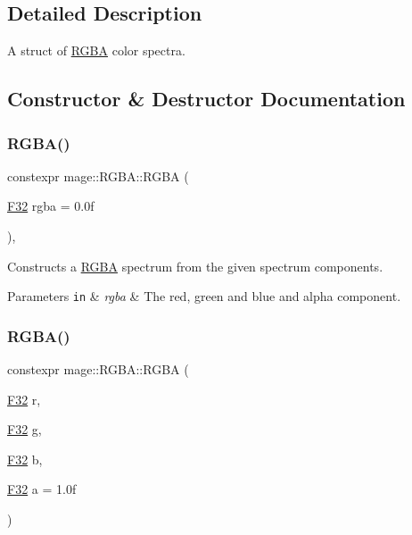 \subsection{Detailed Description}
A struct of \hyperlink{structmage_1_1_r_g_b_a}{R\+G\+BA} color spectra. 

\subsection{Constructor \& Destructor Documentation}
\hypertarget{structmage_1_1_r_g_b_a_afe334e4408a71e808b8cf0bc9dd06dde}{}\label{structmage_1_1_r_g_b_a_afe334e4408a71e808b8cf0bc9dd06dde} 
\subsubsection{\texorpdfstring{R\+G\+B\+A()}{RGBA()}\hspace{0.1cm}{\footnotesize\ttfamily [1/8]}}
{\footnotesize\ttfamily constexpr mage\+::\+R\+G\+B\+A\+::\+R\+G\+BA (\begin{DoxyParamCaption}\item[{\hyperlink{namespacemage_aa97e833b45f06d60a0a9c4fc22ae02c0}{F32}}]{rgba = {\ttfamily 0.0f} }\end{DoxyParamCaption})\hspace{0.3cm}{\ttfamily [explicit]}, {\ttfamily [noexcept]}}

Constructs a \hyperlink{structmage_1_1_r_g_b_a}{R\+G\+BA} spectrum from the given spectrum components.


\begin{DoxyParams}[1]{Parameters}
\mbox{\tt in}  & {\em rgba} & The red, green and blue and alpha component. \\
\hline
\end{DoxyParams}
\hypertarget{structmage_1_1_r_g_b_a_a12ae339b8bcae0a1c0aacad280963ade}{}\label{structmage_1_1_r_g_b_a_a12ae339b8bcae0a1c0aacad280963ade} 
\subsubsection{\texorpdfstring{R\+G\+B\+A()}{RGBA()}\hspace{0.1cm}{\footnotesize\ttfamily [2/8]}}
{\footnotesize\ttfamily constexpr mage\+::\+R\+G\+B\+A\+::\+R\+G\+BA (\begin{DoxyParamCaption}\item[{\hyperlink{namespacemage_aa97e833b45f06d60a0a9c4fc22ae02c0}{F32}}]{r,  }\item[{\hyperlink{namespacemage_aa97e833b45f06d60a0a9c4fc22ae02c0}{F32}}]{g,  }\item[{\hyperlink{namespacemage_aa97e833b45f06d60a0a9c4fc22ae02c0}{F32}}]{b,  }\item[{\hyperlink{namespacemage_aa97e833b45f06d60a0a9c4fc22ae02c0}{F32}}]{a = {\ttfamily 1.0f} }\end{DoxyParamCaption})\hspace{0.3cm}{\ttfamily [noexcept]}}

